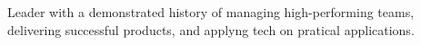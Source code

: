 

\begin{cvparagraph}

	Leader with a demonstrated history of managing high-performing teams,
  delivering successful products, and applyng tech on pratical applications.
\end{cvparagraph}
